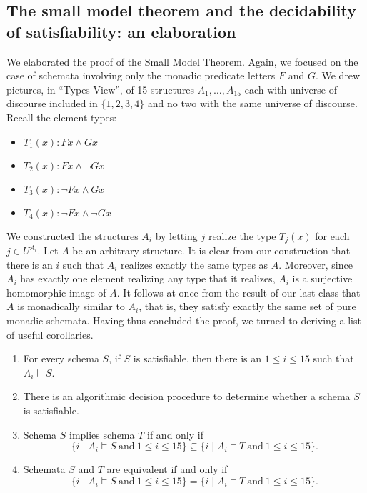 \subsection{The small model theorem and the decidability of satisfiability: an elaboration}

We elaborated the proof of the Small Model Theorem. Again, we focused on the case of schemata involving only the monadic predicate letters $F$ and $G$. We drew pictures, in ``Types View'', of 15 structures $A_1,\ldots,A_{15}$ each with universe of discourse included in $\{1,2,3,4\}$ and no two with the same universe of discourse.  Recall the element types:
\begin{itemize}
\item $T_1(x): Fx\wedge Gx$
\item $T_2(x): Fx\wedge \neg Gx$
\item $T_3(x): \neg Fx\wedge Gx$
\item $T_4(x): \neg Fx\wedge \neg Gx$
\end{itemize}
We constructed the structures $A_i$ by letting $j$ realize the type $T_j(x)$ for each $j\in U^{A_i}$. Let $A$ be an arbitrary structure. It is clear from our construction that there is an $i$ such that $A_i$ realizes exactly the same types as $A$. Moreover, since $A_i$ has exactly one element realizing any type that it realizes, $A_i$ is a surjective homomorphic image of $A$. It follows at once from the result of our last class that $A$ is monadically similar to $A_i$, that is, they satisfy exactly the same set of pure monadic schemata. Having thus concluded the proof, we turned to deriving a list of useful corollaries.
\begin{corollary}\label{monad-cor}
\begin{enumerate}
\item
For every schema $S$, if $S$ is satisfiable, then there is an $1\leq i\leq 15$ such that $A_i\models S$. 
\item
There is an algorithmic decision procedure to determine whether a schema $S$ is satisfiable.
\item\label{imp-item}
Schema $S$ implies schema $T$  if and only if 
\[\{i\mid A_i\models S\ \mbox{and}\ 1\leq i\leq 15\}\subseteq\{i\mid A_i\models T\ \mbox{and}\ 1\leq i\leq 15\}.\]
\item\label{equiv-item}
Schemata $S$ and $T$ are equivalent if and only if 
\[\{i\mid A_i\models S\ \mbox{and}\ 1\leq i\leq 15\}=\{i\mid A_i\models T\ \mbox{and}\ 1\leq i\leq 15\}.\]
\end{enumerate}
\end{corollary}

